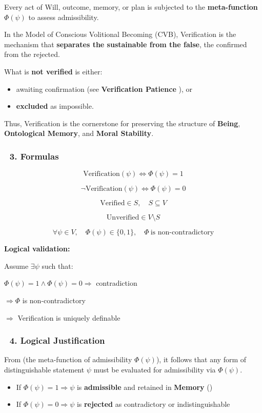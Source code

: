 \documentclass[12pt]{article}
\begin{document}
Every act of Will, outcome, memory, or plan is subjected to the \textbf{meta-function} $\Phi(\psi)$ to assess admissibility.

In the Model of Conscious Volitional Becoming (CVB), Verification is the mechanism that \textbf{separates the sustainable from the false}, the confirmed from the rejected.

What is \textbf{not verified} is either:
\begin{itemize}
\item awaiting confirmation (see \textbf{Verification Patience \text{[11.8]}}), or
\item \textbf{excluded} as impossible.
\end{itemize}

Thus, Verification is the cornerstone for preserving the structure of \textbf{Being}, \textbf{Ontological Memory}, and \textbf{Moral Stability}.

\subsubsection*{🔹 3. Formulas}

\[
\text{Verification}(\psi) \iff \Phi(\psi) = 1
\]

\[
\neg \text{Verification}(\psi) \iff \Phi(\psi) = 0
\]

\[
\text{Verified} \in S,\quad S \subseteq V
\]

\[
\text{Unverified} \in V \setminus S
\]

\[
\forall \psi \in V,\quad \Phi(\psi) \in \{0,1\},\quad \Phi\ \text{is non-contradictory}
\]

\textbf{Logical validation:}

Assume $\exists \psi$ such that:

$\Phi(\psi) = 1 \land \Phi(\psi) = 0 \Rightarrow$ contradiction

$\Rightarrow \Phi$ is non-contradictory

$\Rightarrow$ Verification is uniquely definable

\subsubsection*{🔹 4. Logical Justification}

From \text{[11.1.1]} (the meta-function of admissibility $\Phi(\psi)$), it follows that any form of distinguishable statement $\psi$ must be evaluated for admissibility via $\Phi(\psi)$.

\begin{itemize}
\item If $\Phi(\psi) = 1 \Rightarrow \psi$ is \textbf{admissible} and retained in \textbf{Memory} (\text{[10.3]})
\item If $\Phi(\psi) = 0 \Rightarrow \psi$ is \textbf{rejected} as contradictory or indistinguishable
\end{itemize}
\end{document}
